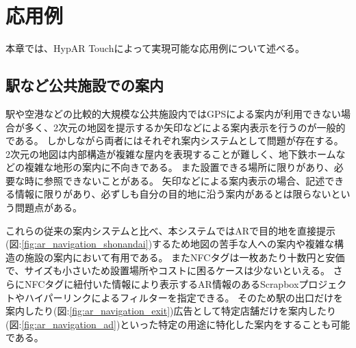 \chapter{応用例}
\label{chap:usage}

本章では、HypAR Touchによって実現可能な応用例について述べる。

\newpage


\section{駅など公共施設での案内}
駅や空港などの比較的大規模な公共施設内ではGPSによる案内が利用できない場合が多く、2次元の地図を提示するか矢印などによる案内表示を行うのが一般的である。
しかしながら両者にはそれぞれ案内システムとして問題が存在する。
2次元の地図は内部構造が複雑な屋内を表現することが難しく、地下鉄ホームなどの複雑な地形の案内に不向きである。
また設置できる場所に限りがあり、必要な時に参照できないことがある。
矢印などによる案内表示の場合、記述できる情報に限りがあり、必ずしも自分の目的地に沿う案内があるとは限らないという問題点がある。

これらの従来の案内システムと比べ、本システムではARで目的地を直接提示(図:\ref{fig:ar_navigation_shonandai})するため地図の苦手な人への案内や複雑な構造の施設の案内において有用である。
またNFCタグは一枚あたり十数円と安価で、サイズも小さいため設置場所やコストに困るケースは少ないといえる。
さらにNFCタグに紐付いた情報により表示するAR情報のあるScrapboxプロジェクトやハイパーリンクによるフィルターを指定できる。
そのため駅の出口だけを案内したり(図:\ref{fig:ar_navigation_exit})広告として特定店舗だけを案内したり(図:\ref{fig:ar_navigation_ad})といった特定の用途に特化した案内をすることも可能である。

